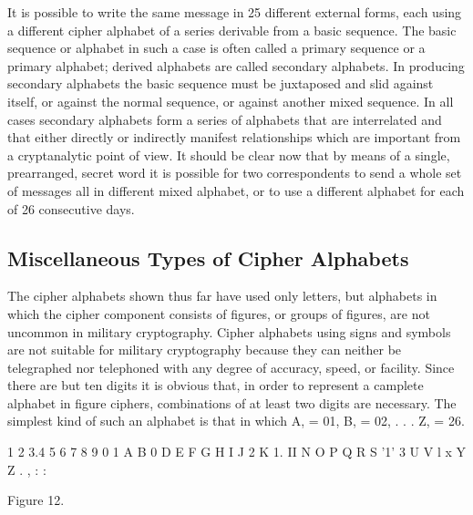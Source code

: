 It is possible to write the same message in 25 different external forms,
each using a different cipher alphabet of a series derivable from a
basic sequence. The basic sequence or alphabet in such a case is often
called a primary sequence or a primary alphabet; derived alphabets
are called secondary alphabets. In producing secondary alphabets the
basic sequence must be juxtaposed and slid against itself, or against
the normal sequence, or against another mixed sequence. In all cases
secondary alphabets form a series of alphabets that are interrelated and
that either directly or indirectly manifest relationships which are important from a cryptanalytic point of view. It should be clear now that
by means of a single, prearranged, secret word it is possible for two
correspondents to send a whole set of messages all in different mixed
alphabet, or to use a different alphabet for each of 26 consecutive days.

\subsection{Miscellaneous Types of Cipher Alphabets}

\mypara The cipher alphabets shown thus far have used only letters, but
alphabets in which the cipher component consists of ﬁgures, or groups
of ﬁgures, are not uncommon in military cryptography. Cipher alphabets
using signs and symbols are not suitable for military cryptography because they can neither be telegraphed nor telephoned with any degree
of accuracy, speed, or facility. Since there are but ten digits it is obvious
that, in order to represent a camplete alphabet in ﬁgure ciphers, combinations of at least two digits are necessary. The simplest kind of such
an alphabet is that in which A, = 01, B, = 02, . . . Z, = 26.

 

1 2 3.4 5 6 7 8 9 0
1 A B 0 D E F G H I J
2 K 1. II N O P Q R S '1'
3 U V l x Y Z . , : :

 

 

 

 

 

 

 

 

 

 

 

 

Figure 12.


